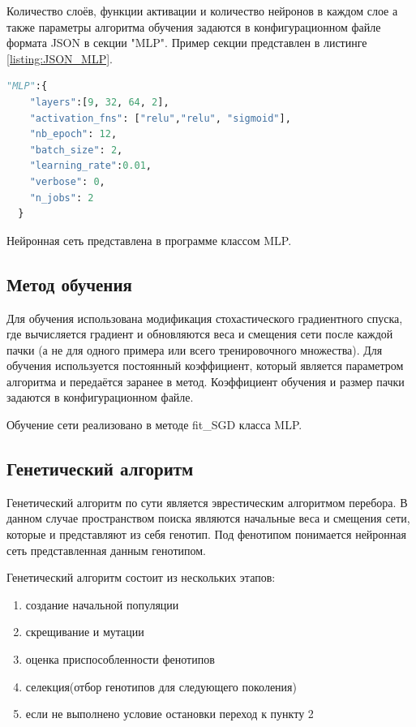\documentclass[a4paper,12pt]{article}
\begin{document}
Количество слоёв, функции активации и количество нейронов в каждом слое а также параметры алгоритма обучения задаются в конфигурационном файле формата JSON в секции "MLP". Пример секции представлен в листинге \ref{listing:JSON_MLP}.

\begin{lstlisting}[language=Python, caption=класс MainWindowUiIntegrationTest, label=listing:JSON_MLP]
 "MLP":{
    "layers":[9, 32, 64, 2],
    "activation_fns": ["relu","relu", "sigmoid"],
    "nb_epoch": 12,
    "batch_size": 2,
    "learning_rate":0.01,
    "verbose": 0,
    "n_jobs": 2
  }
\end{lstlisting}

Нейронная сеть представлена в программе классом MLP.
\subsection{Метод обучения}

Для обучения использована модификация стохастического градиентного спуска, где вычисляется градиент и обновляются веса и смещения сети после каждой пачки (а не для одного примера или всего тренировочного множества). Для обучения используется постоянный коэффициент, который является параметром алгоритма и передаётся заранее в метод. Коэффициент обучения и размер пачки задаются в конфигурационном файле.

Обучение сети реализовано в методе fit\_SGD класса MLP.
\subsection{Генетический алгоритм}
Генетический алгоритм по сути является эврестическим алгоритмом перебора. В данном случае пространством поиска являются начальные веса и смещения сети, которые и представляют из себя генотип. Под фенотипом понимается нейронная сеть представленная данным генотипом.

Генетический алгоритм состоит из нескольких этапов:

\begin{enumerate}
\item создание начальной популяции
\item скрещивание и мутации
\item оценка приспособленности фенотипов
\item селекция(отбор генотипов для следующего поколения)
\item если не выполнено условие остановки переход к пункту 2
\end{enumerate}
\end{document}
